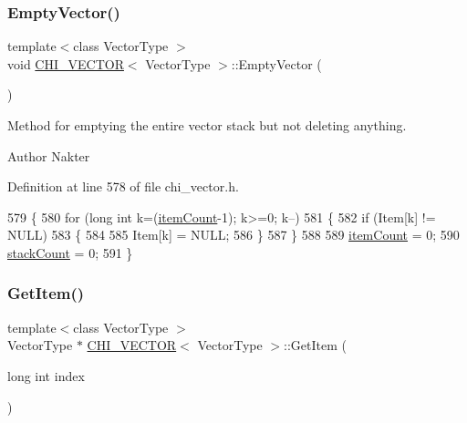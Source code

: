\subsubsection{\texorpdfstring{Empty\+Vector()}{EmptyVector()}}
{\footnotesize\ttfamily template$<$class Vector\+Type $>$ \\
void \hyperlink{class_c_h_i___v_e_c_t_o_r}{C\+H\+I\+\_\+\+V\+E\+C\+T\+OR}$<$ Vector\+Type $>$\+::Empty\+Vector (\begin{DoxyParamCaption}{ }\end{DoxyParamCaption})}

Method for emptying the entire vector stack but not deleting anything.

\begin{DoxyAuthor}{Author}
Nakter 
\end{DoxyAuthor}


Definition at line 578 of file chi\+\_\+vector.\+h.


\begin{DoxyCode}
579 \{
580     \textcolor{keywordflow}{for} (\textcolor{keywordtype}{long} \textcolor{keywordtype}{int} k=(\hyperlink{class_c_h_i___v_e_c_t_o_r_a0d37a8a4650059da0888be2d9c38487a}{itemCount}-1); k>=0; k--)
581     \{
582         \textcolor{keywordflow}{if} (Item[k] != NULL)
583         \{
584 
585         Item[k] = NULL;
586         \}
587     \}
588 
589     \hyperlink{class_c_h_i___v_e_c_t_o_r_a0d37a8a4650059da0888be2d9c38487a}{itemCount} = 0;
590     \hyperlink{class_c_h_i___v_e_c_t_o_r_a91ef30712b0ead293dfe1adc29fee555}{stackCount} = 0;
591 \}
\end{DoxyCode}
\mbox{\label{class_c_h_i___v_e_c_t_o_r_ae6e5604e0fece87ee38645eba659bd46_ae6e5604e0fece87ee38645eba659bd46}} 
\subsubsection{\texorpdfstring{Get\+Item()}{GetItem()}}
{\footnotesize\ttfamily template$<$class Vector\+Type $>$ \\
Vector\+Type $\ast$ \hyperlink{class_c_h_i___v_e_c_t_o_r}{C\+H\+I\+\_\+\+V\+E\+C\+T\+OR}$<$ Vector\+Type $>$\+::Get\+Item (\begin{DoxyParamCaption}\item[{long int}]{index }\end{DoxyParamCaption})}

